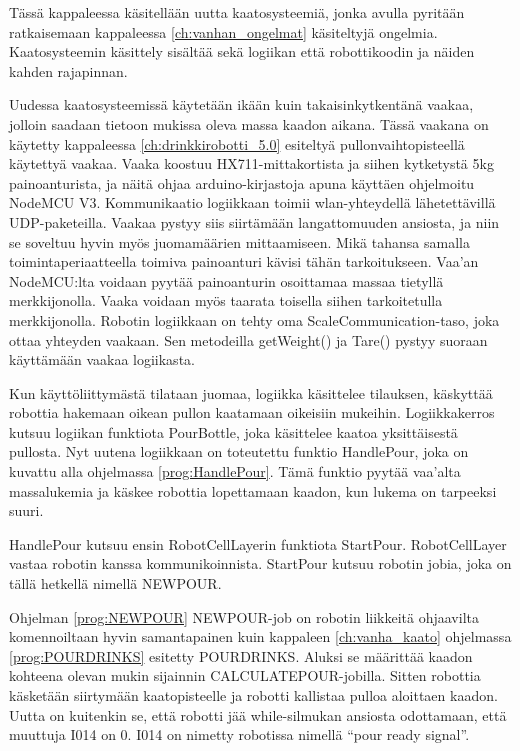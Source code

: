 Tässä kappaleessa käsitellään uutta kaatosysteemiä, jonka avulla pyritään ratkaisemaan kappaleessa \ref{ch:vanhan_ongelmat} käsiteltyjä ongelmia. Kaatosysteemin käsittely sisältää sekä logiikan että robottikoodin ja näiden kahden rajapinnan.

Uudessa kaatosysteemissä käytetään ikään kuin takaisinkytkentänä vaakaa, jolloin saadaan tietoon mukissa oleva massa kaadon aikana. Tässä vaakana on käytetty kappaleessa \ref{ch:drinkkirobotti_5.0} esiteltyä pullonvaihtopisteellä käytettyä vaakaa. Vaaka koostuu HX711-mittakortista ja siihen kytketystä 5kg painoanturista, ja näitä ohjaa arduino-kirjastoja apuna käyttäen ohjelmoitu NodeMCU V3. Kommunikaatio logiikkaan toimii wlan-yhteydellä lähetettävillä UDP-paketeilla. Vaakaa pystyy siis siirtämään langattomuuden ansiosta, ja niin se soveltuu hyvin myös juomamäärien mittaamiseen. Mikä tahansa samalla toimintaperiaatteella toimiva painoanturi kävisi tähän tarkoitukseen. Vaa'an NodeMCU:lta voidaan pyytää painoanturin osoittamaa massaa tietyllä merkkijonolla. Vaaka voidaan myös taarata toisella siihen tarkoitetulla merkkijonolla. Robotin logiikkaan on tehty oma ScaleCommunication-taso, joka ottaa yhteyden vaakaan. Sen metodeilla getWeight() ja Tare() pystyy suoraan käyttämään vaakaa logiikasta.


Kun käyttöliittymästä tilataan juomaa, logiikka käsittelee tilauksen, käskyttää robottia hakemaan oikean pullon kaatamaan oikeisiin mukeihin. Logiikkakerros kutsuu logiikan funktiota PourBottle, joka käsittelee kaatoa yksittäisestä pullosta. Nyt uutena logiikkaan on toteutettu funktio HandlePour, joka on kuvattu alla ohjelmassa \ref{prog:HandlePour}. Tämä funktio pyytää vaa'alta massalukemia ja käskee robottia lopettamaan kaadon, kun lukema on tarpeeksi suuri.

\lstset{style=sharpc}


HandlePour kutsuu ensin RobotCellLayerin funktiota StartPour. RobotCellLayer vastaa robotin kanssa kommunikoinnista. StartPour kutsuu robotin jobia, joka on tällä hetkellä nimellä NEWPOUR.

\lstset{style=Yaskawatyyli}


Ohjelman \ref{prog:NEWPOUR} NEWPOUR-job on robotin liikkeitä ohjaavilta komennoiltaan hyvin samantapainen kuin kappaleen \ref{ch:vanha_kaato} ohjelmassa \ref{prog:POURDRINKS} esitetty POURDRINKS. Aluksi se määrittää kaadon kohteena olevan mukin sijainnin CALCULATEPOUR\hyp{}jobilla. Sitten robottia käsketään siirtymään kaatopisteelle ja robotti kallistaa pulloa aloittaen kaadon. Uutta on kuitenkin se, että robotti jää while-silmukan ansiosta odottamaan, että muuttuja I014 on 0. I014 on nimetty robotissa nimellä ``pour ready signal''.

